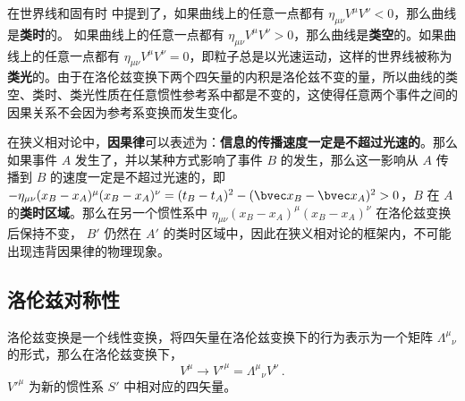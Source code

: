 在世界线和固有时 中提到了，如果曲线上的任意一点都有 $\eta_{\mu\nu}V^\mu V^\nu<0$，那么曲线是\textbf{类时}的。
如果曲线上的任意一点都有 $\eta_{\mu\nu}V^\mu V^\nu>0$，那么曲线是\textbf{类空}的。如果曲线上的任意一点都有 $\eta_{\mu\nu}V^\mu V^\nu=0$，即粒子总是以光速运动，这样的世界线被称为\textbf{类光}的。由于在洛伦兹变换下两个四矢量的内积是洛伦兹不变的量，所以曲线的类空、类时、类光性质在任意惯性参考系中都是不变的，这使得任意两个事件之间的因果关系不会因为参考系变换而发生变化。

在狭义相对论中，\textbf{因果律}可以表述为：\textbf{信息的传播速度一定是不超过光速的}。那么如果事件 $A$ 发生了，并以某种方式影响了事件 $B$ 的发生，那么这一影响从 $A$ 传播到 $B$ 的速度一定是不超过光速的，即 $-\eta_{\mu\nu} (x_B-x_A)^\mu (x_B-x_A)^\nu = (t_B-t_A)^2-(\bvec x_B-\bvec x_A)^2>0$，$B$ 在 $A$ 的\textbf{类时区域}。那么在另一个惯性系中 $\eta_{\mu\nu} (x_B-x_A)^\mu (x_B-x_A)^\nu$ 在洛伦兹变换后保持不变， $B'$ 仍然在 $A'$ 的类时区域中，因此在狭义相对论的框架内，不可能出现违背因果律的物理现象。
\subsection{洛伦兹对称性}
洛伦兹变换是一个线性变换，将四矢量在洛伦兹变换下的行为表示为一个矩阵 $\Lambda^\mu{}_\nu $ 的形式，那么在洛伦兹变换下，
\begin{equation}
V^\mu \rightarrow {V'}^\mu = \Lambda^\mu{}_\nu V^\nu~.
\end{equation}
${V'}^\mu$ 为新的惯性系 $S'$ 中相对应的四矢量。

